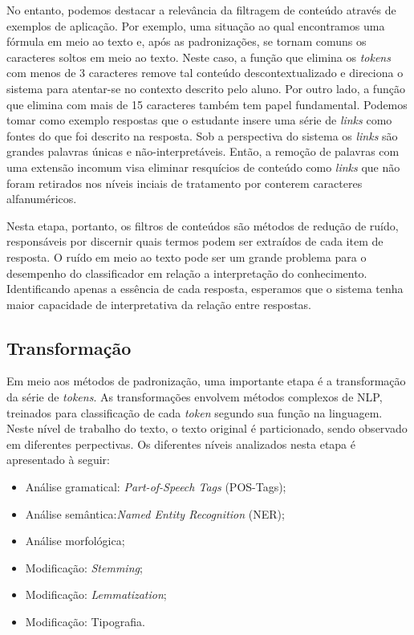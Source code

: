 No entanto, podemos destacar a relevância da filtragem de conteúdo através de exemplos de aplicação. Por exemplo, uma situação ao qual encontramos uma fórmula em meio ao texto e, após as padronizações, se tornam comuns os caracteres soltos em meio ao texto. Neste caso, a função que elimina os \textit{tokens} com menos de 3 caracteres remove tal conteúdo descontextualizado e direciona o sistema para atentar-se no contexto descrito pelo aluno. Por outro lado, a função que elimina com mais de 15 caracteres também tem papel fundamental. Podemos tomar como exemplo respostas que o estudante insere uma série de \textit{links} como fontes do que foi descrito na resposta. Sob a perspectiva do sistema os \textit{links} são grandes palavras únicas e não-interpretáveis. Então, a remoção de palavras com uma extensão incomum visa eliminar resquícios de conteúdo como \textit{links} que não foram retirados nos níveis inciais de tratamento por conterem caracteres alfanuméricos.

Nesta etapa, portanto, os filtros de conteúdos são métodos de redução de ruído, responsáveis por discernir quais termos podem ser extraídos de cada item de resposta. O ruído em meio ao texto pode ser um grande problema para o desempenho do classificador em relação a interpretação do conhecimento. Identificando apenas a essência de cada resposta, esperamos que o sistema tenha maior capacidade de interpretativa da relação entre respostas.

\subsection{Transformação}

Em meio aos métodos de padronização, uma importante etapa é a transformação da série de \textit{tokens}. As transformações envolvem métodos complexos de NLP, treinados para classificação de cada \textit{token} segundo sua função na linguagem. Neste nível de trabalho do texto, o texto original é particionado, sendo observado em diferentes perpectivas. Os diferentes níveis analizados nesta etapa é apresentado à seguir:

\begin{itemize}
	\item Análise gramatical: \textit{Part-of-Speech Tags} (POS-Tags);
	\item Análise semântica:\textit{Named Entity Recognition} (NER);
	\item Análise morfológica;
	\item Modificação: \textit{Stemming};
	\item Modificação: \textit{Lemmatization};
	\item Modificação: Tipografia.
\end{itemize}

